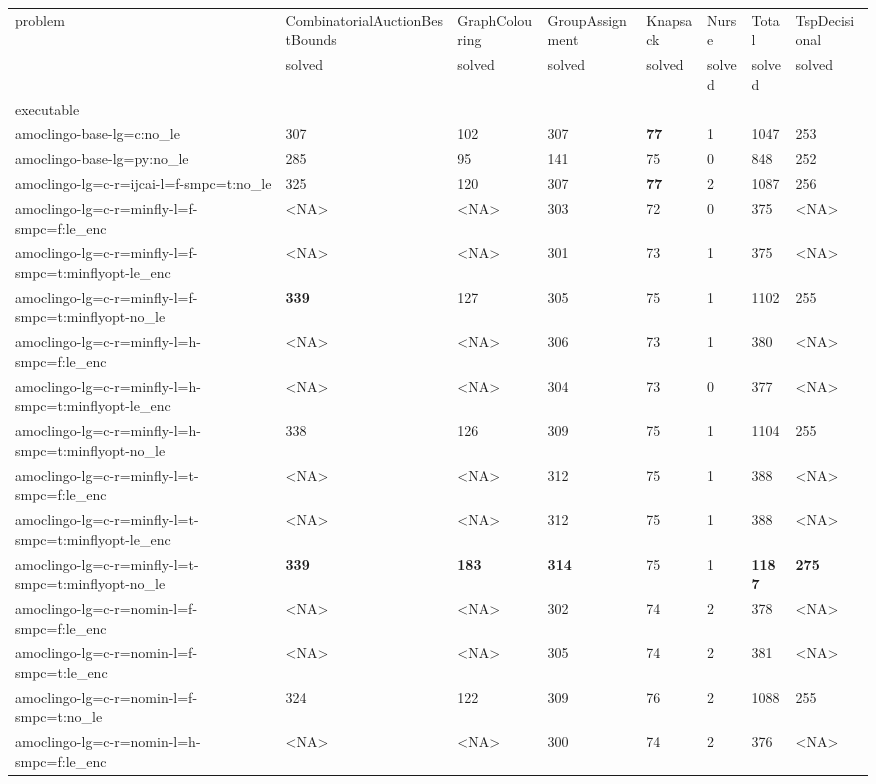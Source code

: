 \documentclass{article}
\begin{document}
            \begin{table}[t!]
\label{tab:results}
\begin{tabular}{llllllll}
\toprule
problem & CombinatorialAuctionBestBounds & GraphColouring & GroupAssignment & Knapsack & Nurse & Total & TspDecisional \\
 & solved & solved & solved & solved & solved & solved & solved \\
executable &  &  &  &  &  &  &  \\
\midrule
amoclingo-base-lg=c:no\_le & 307 & 102 & 307 & \textbf{77} & 1 & 1047 & 253 \\
amoclingo-base-lg=py:no\_le & 285 & 95 & 141 & 75 & 0 & 848 & 252 \\
amoclingo-lg=c-r=ijcai-l=f-smpc=t:no\_le & 325 & 120 & 307 & \textbf{77} & 2 & 1087 & 256 \\
amoclingo-lg=c-r=minfly-l=f-smpc=f:le\_enc & <NA> & <NA> & 303 & 72 & 0 & 375 & <NA> \\
amoclingo-lg=c-r=minfly-l=f-smpc=t:minflyopt-le\_enc & <NA> & <NA> & 301 & 73 & 1 & 375 & <NA> \\
amoclingo-lg=c-r=minfly-l=f-smpc=t:minflyopt-no\_le & \textbf{339} & 127 & 305 & 75 & 1 & 1102 & 255 \\
amoclingo-lg=c-r=minfly-l=h-smpc=f:le\_enc & <NA> & <NA> & 306 & 73 & 1 & 380 & <NA> \\
amoclingo-lg=c-r=minfly-l=h-smpc=t:minflyopt-le\_enc & <NA> & <NA> & 304 & 73 & 0 & 377 & <NA> \\
amoclingo-lg=c-r=minfly-l=h-smpc=t:minflyopt-no\_le & 338 & 126 & 309 & 75 & 1 & 1104 & 255 \\
amoclingo-lg=c-r=minfly-l=t-smpc=f:le\_enc & <NA> & <NA> & 312 & 75 & 1 & 388 & <NA> \\
amoclingo-lg=c-r=minfly-l=t-smpc=t:minflyopt-le\_enc & <NA> & <NA> & 312 & 75 & 1 & 388 & <NA> \\
amoclingo-lg=c-r=minfly-l=t-smpc=t:minflyopt-no\_le & \textbf{339} & \textbf{183} & \textbf{314} & 75 & 1 & \textbf{1187} & \textbf{275} \\
amoclingo-lg=c-r=nomin-l=f-smpc=f:le\_enc & <NA> & <NA> & 302 & 74 & 2 & 378 & <NA> \\
amoclingo-lg=c-r=nomin-l=f-smpc=t:le\_enc & <NA> & <NA> & 305 & 74 & 2 & 381 & <NA> \\
amoclingo-lg=c-r=nomin-l=f-smpc=t:no\_le & 324 & 122 & 309 & 76 & 2 & 1088 & 255 \\
amoclingo-lg=c-r=nomin-l=h-smpc=f:le\_enc & <NA> & <NA> & 300 & 74 & 2 & 376 & <NA> \\

\end{tabular}
\end{table}
\end{document}
